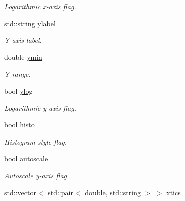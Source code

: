\begin{DoxyCompactItemize}
\begin{DoxyCompactList}\small\item\em Logarithmic x-\/axis flag. \end{DoxyCompactList}\item 
\hypertarget{a00431_ac969a5a107fbcf66229c2fe680413ea9}{}std\+::string \hyperlink{a00431_ac969a5a107fbcf66229c2fe680413ea9}{ylabel}\label{a00431_ac969a5a107fbcf66229c2fe680413ea9}

\begin{DoxyCompactList}\small\item\em Y-\/axis label. \end{DoxyCompactList}\item 
\hypertarget{a00431_af47eea7344b159425f23e6ca2a7db886}{}double \hyperlink{a00431_af47eea7344b159425f23e6ca2a7db886}{ymin}\label{a00431_af47eea7344b159425f23e6ca2a7db886}

\begin{DoxyCompactList}\small\item\em Y-\/range. \end{DoxyCompactList}\item 
\hypertarget{a00431_ad83b5bd831aa2962d307302ee424a312}{}bool \hyperlink{a00431_ad83b5bd831aa2962d307302ee424a312}{ylog}\label{a00431_ad83b5bd831aa2962d307302ee424a312}

\begin{DoxyCompactList}\small\item\em Logarithmic y-\/axis flag. \end{DoxyCompactList}\item 
\hypertarget{a00431_a4a18be76aaaced5fb4238b11ab8ec56e}{}bool \hyperlink{a00431_a4a18be76aaaced5fb4238b11ab8ec56e}{histo}\label{a00431_a4a18be76aaaced5fb4238b11ab8ec56e}

\begin{DoxyCompactList}\small\item\em Histogram style flag. \end{DoxyCompactList}\item 
\hypertarget{a00431_a2fbf9fa24eecf431588be7324bf637ce}{}bool \hyperlink{a00431_a2fbf9fa24eecf431588be7324bf637ce}{autoscale}\label{a00431_a2fbf9fa24eecf431588be7324bf637ce}

\begin{DoxyCompactList}\small\item\em Autoscale y-\/axis flag. \end{DoxyCompactList}\item 
\hypertarget{a00431_a40068374c389009967b58dfcfaa805b7}{}std\+::vector$<$ std\+::pair$<$ double, std\+::string $>$ $>$ \hyperlink{a00431_a40068374c389009967b58dfcfaa805b7}{xtics}\label{a00431_a40068374c389009967b58dfcfaa805b7}


\end{DoxyCompactItemize}
